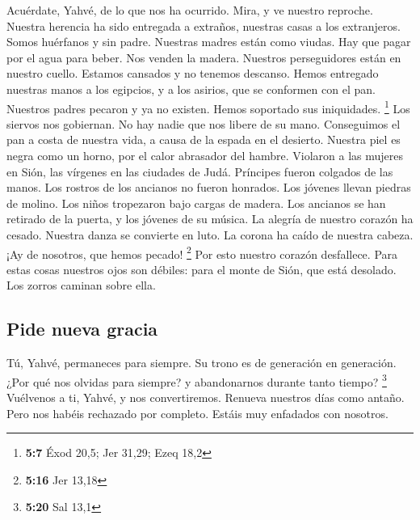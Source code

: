 \begin{paracol}{2}
 Acuérdate, Yahvé, de lo que nos ha ocurrido. Mira, y ve
nuestro reproche.  Nuestra herencia ha sido entregada a
extraños, nuestras casas a los extranjeros.  Somos
huérfanos y sin padre. Nuestras madres están como viudas. 
Hay que pagar por el agua para beber. Nos venden la madera.
 Nuestros perseguidores están en nuestro cuello. Estamos
cansados y no tenemos descanso.  Hemos entregado nuestras
manos a los egipcios, y a los asirios, que se conformen con el pan.
 Nuestros padres pecaron y ya no existen. Hemos soportado
sus iniquidades. \footnote{\textbf{5:7} Éxod 20,5; Jer 31,29; Ezeq 18,2}
 Los siervos nos gobiernan. No hay nadie que nos libere de
su mano.  Conseguimos el pan a costa de nuestra vida, a
causa de la espada en el desierto.  Nuestra piel es negra
como un horno, por el calor abrasador del hambre. 
Violaron a las mujeres en Sión, las vírgenes en las ciudades de Judá.
 Príncipes fueron colgados de las manos. Los rostros de
los ancianos no fueron honrados.  Los jóvenes llevan
piedras de molino. Los niños tropezaron bajo cargas de madera.
 Los ancianos se han retirado de la puerta, y los jóvenes
de su música.  La alegría de nuestro corazón ha cesado.
Nuestra danza se convierte en luto.  La corona ha caído
de nuestra cabeza. ¡Ay de nosotros, que hemos pecado! \footnote{\textbf{5:16}
  Jer 13,18}  Por esto nuestro corazón desfallece. Para
estas cosas nuestros ojos son débiles:  para el monte de
Sión, que está desolado. Los zorros caminan sobre ella.

\hypertarget{pide-nueva-gracia}{%
\subsection{Pide nueva gracia}\label{pide-nueva-gracia}}

 Tú, Yahvé, permaneces para siempre. Su trono es de
generación en generación.  ¿Por qué nos olvidas para
siempre? y abandonarnos durante tanto tiempo? \footnote{\textbf{5:20}
  Sal 13,1}  Vuélvenos a ti, Yahvé, y nos convertiremos.
Renueva nuestros días como antaño.  Pero nos habéis
rechazado por completo. Estáis muy enfadados con nosotros. \switchcolumn
\begin{otherlanguage}{english}


\end{otherlanguage}
\end{paracol}
